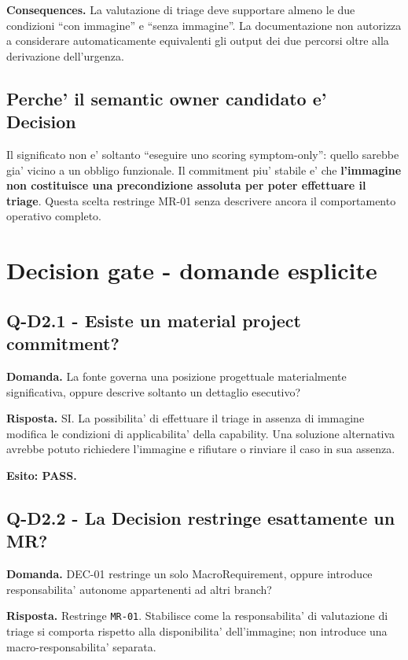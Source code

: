 \documentclass[11pt,a4paper]{article}
\begin{document}
\textbf{Consequences.} La valutazione di triage deve supportare almeno le due condizioni ``con immagine'' e ``senza immagine''. La documentazione non autorizza a considerare automaticamente equivalenti gli output dei due percorsi oltre alla derivazione dell'urgenza.

\subsection{Perche' il semantic owner candidato e' Decision}
Il significato non e' soltanto ``eseguire uno scoring symptom-only'': quello sarebbe gia' vicino a un obbligo funzionale. Il commitment piu' stabile e' che \textbf{l'immagine non costituisce una precondizione assoluta per poter effettuare il triage}. Questa scelta restringe MR-01 senza descrivere ancora il comportamento operativo completo.

\section{Decision gate - domande esplicite}

\subsection{Q-D2.1 - Esiste un material project commitment?}
\begin{ddtacheck}
\textbf{Domanda.} La fonte governa una posizione progettuale materialmente significativa, oppure descrive soltanto un dettaglio esecutivo?
\end{ddtacheck}

\textbf{Risposta.} SI. La possibilita' di effettuare il triage in assenza di immagine modifica le condizioni di applicabilita' della capability. Una soluzione alternativa avrebbe potuto richiedere l'immagine e rifiutare o rinviare il caso in sua assenza.

\textbf{Esito: PASS.}

\subsection{Q-D2.2 - La Decision restringe esattamente un MR?}
\begin{ddtacheck}
\textbf{Domanda.} DEC-01 restringe un solo MacroRequirement, oppure introduce responsabilita' autonome appartenenti ad altri branch?
\end{ddtacheck}

\textbf{Risposta.} Restringe \texttt{MR-01}. Stabilisce come la responsabilita' di valutazione di triage si comporta rispetto alla disponibilita' dell'immagine; non introduce una macro-responsabilita' separata.
\end{document}
